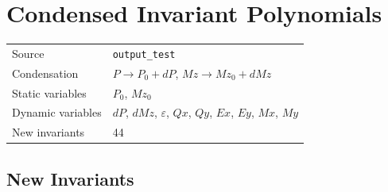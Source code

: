 \documentclass{article}
\begin{document}
\section*{Condensed Invariant Polynomials}

\begin{tabular}{ll}
\toprule
Source & \texttt{output_test} \\
Condensation & $P \to P_{0} + dP$, $Mz \to Mz_{0} + dMz$ \\
Static variables & $P_{0}$, $Mz_{0}$ \\
Dynamic variables & $dP$, $dMz$, $ε$, $Qx$, $Qy$, $Ex$, $Ey$, $Mx$, $My$ \\
New invariants & 44 \\
\bottomrule
\end{tabular}

\subsection*{New Invariants}
\end{document}
